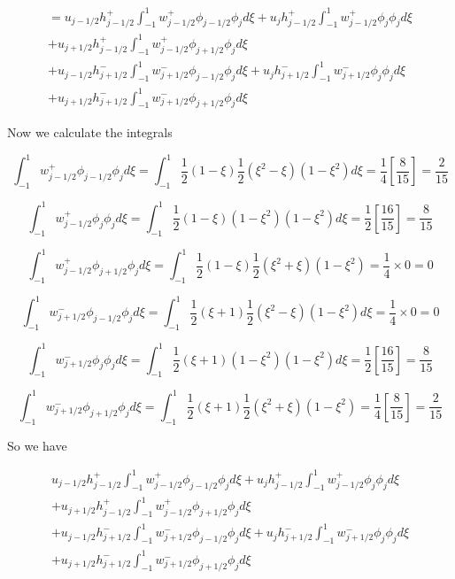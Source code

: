 \documentclass[12pt]{article}
\begin{document}
\begin{multline*}
= u_{j-1/2}h^+_{j-1/2}  \int_{-1}^{1}w^+_{j-1/2}\phi_{j-1/2} \phi_{j} d\xi + 
 u_{j}h^+_{j-1/2} \int_{-1}^{1} w^+_{j-1/2}\phi_{j} \phi_{j} d\xi  \\+
 u_{j+1/2}h^+_{j-1/2} \int_{-1}^{1} w^+_{j-1/2}\phi_{j+1/2} \phi_{j} d\xi \\+
 u_{j-1/2}h^-_{j+1/2}  \int_{-1}^{1}w^-_{j+1/2}\phi_{j-1/2} \phi_{j} d\xi + 
  u_{j}h^-_{j+1/2} \int_{-1}^{1} w^-_{j+1/2}\phi_{j} \phi_{j} d\xi  \\+
  u_{j+1/2}h^-_{j+1/2} \int_{-1}^{1} w^-_{j+1/2}\phi_{j+1/2} \phi_{j} d\xi
\end{multline*}


Now we calculate the integrals

\[\int_{-1}^{1}w^+_{j-1/2}\phi_{j-1/2} \phi_{j} d\xi = \int_{-1}^{1}\frac{1}{2}\left(1 - \xi \right) \frac{1}{2}\left(\xi^2 - \xi\right) \left(1 - \xi^2\right) d\xi  = \frac{1}{4}\left[\frac{8}{15}\right] = \frac{2}{15}\]

\[\int_{-1}^{1} w^+_{j-1/2}\phi_{j} \phi_{j} d\xi =   \int_{-1}^{1}\frac{1}{2}\left(1 - \xi \right) \left(1 - \xi^2\right) \left(1 - \xi^2\right) d\xi = \frac{1}{2}\left[\frac{16}{15}\right] = \frac{8}{15}\]

\[\int_{-1}^{1} w^+_{j-1/2}\phi_{j+1/2} \phi_{j} d\xi = \int_{-1}^{1}\frac{1}{2}\left(1 - \xi \right) \frac{1}{2}\left(\xi^2 + \xi\right) \left(1 - \xi^2\right) = \frac{1}{4} \times  0 = 0\]

\[\int_{-1}^{1}w^-_{j+1/2}\phi_{j-1/2} \phi_{j} d\xi = \int_{-1}^{1}\frac{1}{2}\left(\xi  + 1 \right) \frac{1}{2}\left(\xi^2 - \xi\right) \left(1 - \xi^2\right) d\xi  = \frac{1}{4} \times  0 = 0 \]

\[\int_{-1}^{1} w^-_{j+1/2}\phi_{j} \phi_{j} d\xi =  \int_{-1}^{1}\frac{1}{2}\left(\xi + 1 \right) \left(1 - \xi^2\right) \left(1 - \xi^2\right) d\xi  = \frac{1}{2}\left[\frac{16}{15}\right] = \frac{8}{15}\]

\[\int_{-1}^{1} w^-_{j+1/2}\phi_{j+1/2} \phi_{j} d\xi =  \int_{-1}^{1}\frac{1}{2}\left(\xi  + 1 \right) \frac{1}{2}\left(\xi^2 + \xi\right) \left(1 - \xi^2\right) = \frac{1}{4}\left[\frac{8}{15}\right] = \frac{2}{15}\]

So we have 

\begin{multline*}
u_{j-1/2}h^+_{j-1/2}  \int_{-1}^{1}w^+_{j-1/2}\phi_{j-1/2} \phi_{j} d\xi + 
 u_{j}h^+_{j-1/2} \int_{-1}^{1} w^+_{j-1/2}\phi_{j} \phi_{j} d\xi  \\+
 u_{j+1/2}h^+_{j-1/2} \int_{-1}^{1} w^+_{j-1/2}\phi_{j+1/2} \phi_{j} d\xi \\+
 u_{j-1/2}h^-_{j+1/2}  \int_{-1}^{1}w^-_{j+1/2}\phi_{j-1/2} \phi_{j} d\xi + 
  u_{j}h^-_{j+1/2} \int_{-1}^{1} w^-_{j+1/2}\phi_{j} \phi_{j} d\xi  \\+
  u_{j+1/2}h^-_{j+1/2} \int_{-1}^{1} w^-_{j+1/2}\phi_{j+1/2} \phi_{j} d\xi
\end{multline*}
\end{document}

